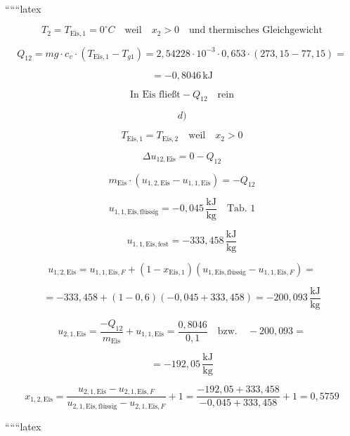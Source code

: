 ``````latex


\[
T_2 = T_{\text{Eis},1} = 0^\circ C \quad \text{weil} \quad x_2 > 0 \quad \text{und thermisches Gleichgewicht}
\]

\[
Q_{12} = m g \cdot c_v \cdot (T_{\text{Eis},1} - T_{g1}) = 2,54228 \cdot 10^{-3} \cdot 0,653 \cdot (273,15 - 77,15) =
\]

\[
= -0,8046 \, \text{kJ}
\]

\[
\text{In Eis fließt} -Q_{12} \quad \text{rein}
\]

\[
d)
\]

\[
T_{\text{Eis},1} = T_{\text{Eis},2} \quad \text{weil} \quad x_2 > 0
\]

\[
\Delta u_{12,\text{Eis}} = 0 - Q_{12}
\]

\[
m_{\text{Eis}} \cdot (u_{1,2,\text{Eis}} - u_{1,1,\text{Eis}}) = -Q_{12}
\]

\[
u_{1,1,\text{Eis},\text{flüssig}} = -0,045 \, \frac{\text{kJ}}{\text{kg}} \quad \text{Tab. 1}
\]

\[
u_{1,1,\text{Eis},\text{fest}} = -333,458 \, \frac{\text{kJ}}{\text{kg}}
\]

\[
u_{1,2,\text{Eis}} = u_{1,1,\text{Eis},F} + (1 - x_{\text{Eis},1}) \left( u_{1,\text{Eis},\text{flüssig}} - u_{1,1,\text{Eis},F} \right) =
\]

\[
= -333,458 + (1 - 0,6) \left( -0,045 + 333,458 \right) = -200,093 \, \frac{\text{kJ}}{\text{kg}}
\]

\[
u_{2,1,\text{Eis}} = \frac{-Q_{12}}{m_{\text{Eis}}} + u_{1,1,\text{Eis}} = \frac{0,8046}{0,1} \quad \text{bzw.} \quad -200,093 =
\]

\[
= -192,05 \, \frac{\text{kJ}}{\text{kg}}
\]

\[
x_{1,2,\text{Eis}} = \frac{u_{2,1,\text{Eis}} - u_{2,1,\text{Eis},F}}{u_{2,1,\text{Eis},\text{flüssig}} - u_{2,1,\text{Eis},F}} + 1 = \frac{-192,05 + 333,458}{-0,045 + 333,458} + 1 = 0,5759
\]

``````latex


